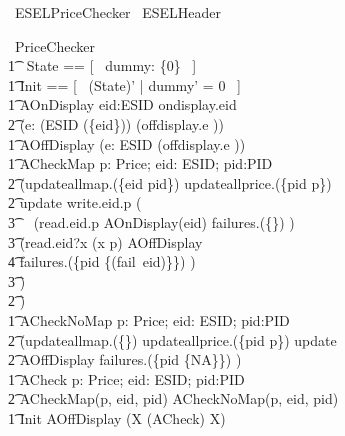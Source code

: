 \begin{zsection}
	\SECTION\ ESELPriceChecker \parents\ ESELHeader
\end{zsection}

\begin{circus}
	\circprocess\ PriceChecker \circdef \circbegin \\
        \t1 \circstate\ State == [~ dummy: \{0\} ~] \\
    	\t1	Init == [~ (State)' | dummy' = 0 ~] \\
        \t1 AOnDisplay \circdef eid:ESID \circspot ondisplay.eid \then \\
            \t2 (\Interleave e: (ESID \setminus (\{eid\})) \linter \emptyset \rinter \circspot (offdisplay.e \then \Skip)) \\
        \t1 AOffDisplay \circdef (\Interleave e: ESID \linter \emptyset \rinter \circspot (offdisplay.e \then \Skip)) \\
        \t1 ACheckMap \circdef p: Price; eid: ESID; pid:PID \circspot \\
            \t2 (updateallmap.(\{eid \mapsto pid\}) \then updateallprice.(\{pid \mapsto p\}) \then \\
            \t2 update \then write.eid.p \then ( \\
                \t3 \,\,\,\,\,\,(read.eid.p \then AOnDisplay(eid) \circseq failures.(\{\}) \then \Skip) \\
                \t3 \extchoice (read.eid?x \prefixcolon (x \neq p) \then AOffDisplay \circseq \\
                \t4 failures.(\{pid \mapsto \{(fail~eid)\}\}) \then \Skip) \\
                \t3 ) \\
            \t2 ) \\
        \t1 ACheckNoMap \circdef p: Price; eid: ESID; pid:PID \circspot \\
            \t2 (updateallmap.(\{\}) \then updateallprice.(\{pid \mapsto p\}) \then update \then \\
            \t2 AOffDisplay \circseq failures.(\{pid \mapsto \{NA\}\}) \then \Skip) \\
        \t1 ACheck \circdef \circvar p: Price; eid: ESID; pid:PID \circspot \\
            \t2 ACheckMap(p, eid, pid) \extchoice ACheckNoMap(p, eid, pid) \\
	    \t1 \circspot Init \circseq AOffDisplay \circseq (\circmu X \circspot (ACheck) \circseq X) \\
	\circend
\end{circus}

